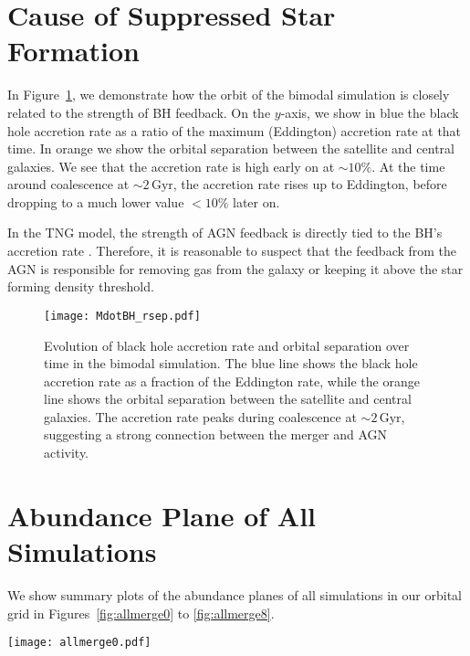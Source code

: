 \documentclass[twocolumn,linenumbers,trackchanges]{aastex631}
\newcommand{\Gyr}{\ensuremath{\textrm{Gyr}}}
\newcommand{\FeH}{\ensuremath{[\textrm{Fe}/\textrm{H}]}}
\newcommand{\MgFe}{\ensuremath{[\textrm{Mg}/\textrm{Fe}]}}
\begin{document}
\section{Cause of Suppressed Star Formation}\label{app:cause_qui}
In Figure~\ref{fig:MdotBH_rsep}, we demonstrate how the orbit of the bimodal simulation is closely related to the strength of BH feedback. On the $y$-axis, we show in blue the black hole accretion rate as a ratio of the maximum (Eddington) accretion rate at that time. In orange we show the orbital separation between the satellite and central galaxies. We see that the accretion rate is high early on at $\sim10\%$. At the time around coalescence at $\sim2\,\Gyr$, the accretion rate rises up to Eddington, before dropping to a much lower value $<10\%$ later on.

In the TNG model, the strength of AGN feedback is directly tied to the BH's accretion rate \citep{2017MNRAS.465.3291W}. Therefore, it is reasonable to suspect that the feedback from the AGN is responsible for removing gas from the galaxy or keeping it above the star forming density threshold.

\begin{figure}
  \centering
  \texttt{[image: MdotBH\_rsep.pdf]}
  \caption{Evolution of black hole accretion rate and orbital separation over time in the bimodal simulation. The blue line shows the black hole accretion rate as a fraction of the Eddington rate, while the orange line shows the orbital separation between the satellite and central galaxies. The accretion rate peaks during coalescence at $\sim2\,\Gyr$, suggesting a strong connection between the merger and AGN activity.}
  \label{fig:MdotBH_rsep}
\end{figure}

\section{Abundance Plane of All Simulations}\label{app:allmerge}
We show summary plots of the abundance planes of all simulations in our orbital grid in Figures~\ref{fig:allmerge0} to \ref{fig:allmerge8}.

\begin{figure*}
  \centering
  \texttt{[image: allmerge0.pdf]}
  \caption{A summary of the abundance plane and star formation history of all simulations within the orbital grid. Each figure shows the outcome of a simulation at a fixed $R_0$ and $V_0$, varying $\eta$. The title of each column shows the $R_0$, $V_0$, and $\eta$ of that simulation, in order. The upper and middle rows replicate Figure~\ref{fig:fig1}, which show the distribution of stars in the abundance plane of \MgFe{}-\FeH{} as well as 1D histograms at a fixed \FeH{} of $-0.5$, $-0.25$, $0$, and $0.25$. The lower rows replicate Figure~\ref{fig:before_after_sfh_by_iron}, showing the star formation history at each \FeH{}.}
  \label{fig:allmerge0}
\end{figure*}
\end{document}
